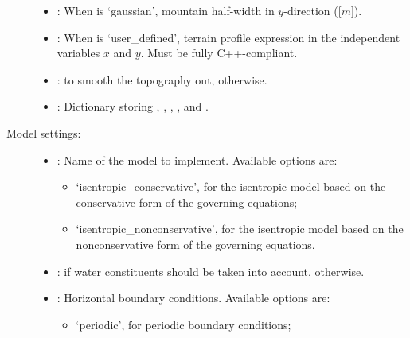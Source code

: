 \documentclass[letterpaper,10pt,english]{sphinxmanual}
\begin{document}
\begin{description}
\begin{itemize}
\item {} 
: When  is ‘gaussian’, mountain               half-width in \(y\)-direction ({[}\(m\){]}).

\item {} 
: When  is ‘user\_defined’, terrain profile                expression in the independent variables \(x\) and \(y\). Must be fully C++-compliant.

\item {} 
:  to smooth the topography out,  otherwise.

\item {} 
: Dictionary storing ,           , , ,             and .

\end{itemize}

\item[{Model settings:}] \leavevmode\begin{itemize}
\item {} 
: Name of the model to implement. Available options are:
\begin{itemize}
\item {} 
‘isentropic\_conservative’, for the isentropic model based on the conservative form                            of the governing equations;

\item {} 
‘isentropic\_nonconservative’, for the isentropic model based on the nonconservative form                              of the governing equations.

\end{itemize}

\item {} 
:  if water constituents should be taken into account,            otherwise.

\item {} 
: Horizontal boundary conditions. Available options are:
\begin{itemize}
\item {} 
‘periodic’, for periodic boundary conditions;


\end{itemize}
\end{itemize}
\end{description}
\end{document}
